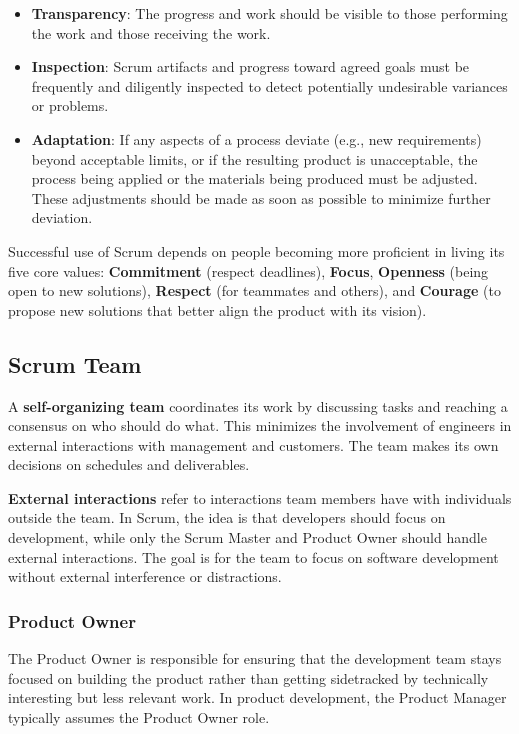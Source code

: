\begin{itemize}
    \item \textbf{Transparency}: The progress and work should be visible to those performing the work and those receiving the work.
    \item \textbf{Inspection}: Scrum artifacts and progress toward agreed goals must be frequently and diligently inspected to detect potentially undesirable variances or problems.
    \item \textbf{Adaptation}: If any aspects of a process deviate (e.g., new requirements) beyond acceptable limits, or if the resulting product is unacceptable, the process being applied or the materials being produced must be adjusted. These adjustments should be made as soon as possible to minimize further deviation.
\end{itemize}

Successful use of Scrum depends on people becoming more proficient in living its five core values: \textbf{Commitment} (respect deadlines), \textbf{Focus}, \textbf{Openness} (being open to new solutions), \textbf{Respect} (for teammates and others), and \textbf{Courage} (to propose new solutions that better align the product with its vision).

\subsection{Scrum Team}

A \textbf{self-organizing team} coordinates its work by discussing tasks and reaching a consensus on who should do what. This minimizes the involvement of engineers in external interactions with management and customers. The team makes its own decisions on schedules and deliverables.

\textbf{External interactions} refer to interactions team members have with individuals outside the team. In Scrum, the idea is that developers should focus on development, while only the Scrum Master and Product Owner should handle external interactions. The goal is for the team to focus on software development without external interference or distractions.

\subsubsection{Product Owner}

The Product Owner is responsible for ensuring that the development team stays focused on building the product rather than getting sidetracked by technically interesting but less relevant work. In product development, the Product Manager typically assumes the Product Owner role. \\

